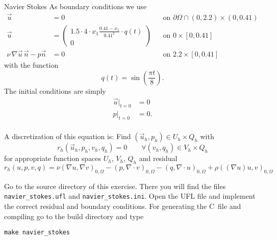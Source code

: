 \documentclass[12pt,a4paper]{article}
\def\CC{{C\nolinebreak[4]\hspace{-.05em}\raisebox{.4ex}{\tiny\bf ++}}}
\begin{document}
\begin{Exercise}{Navier Stokes}
  As boundary conditions we use
  \begin{align*}
    \vec{u} &= 0 && \text{on $\partial\Omega \cap (0,2.2)\times(0,0.41)$} \\
    \vec{u} &=
    \begin{pmatrix}
      1.5 \cdot 4 \cdot x_1 \frac{0.41-x_1}{0.41^2} \cdot q(t) \\ 0
    \end{pmatrix} && \text{on $0\times[0,0.41]$}\\
    \nu \, \nabla \vec{u} \, \vec{n} - p\vec{n} &= 0 && \text{on $2.2\times[0,0.41]$}
  \end{align*}
  with the function
  \begin{equation*}
    q(t) = \sin\left(\frac{\pi t}{8}\right).
  \end{equation*}
  The initial conditions are simply
  \begin{align*}
    \vec{u}|_{t=0} &= 0 \\
    p|_{t=0} &= 0. \\
  \end{align*}

  A discretization of this equation is: Find
  $(\vec{u}_h,p_h) \in U_h\times Q_h$ with
  \begin{equation*}
    r_h(\vec{u}_h, p_h, v_h, q_h) = 0 \qquad \forall (v_h,q_h) \in V_h\times Q_h
  \end{equation*}
  for appropriate function spaces $U_h$, $V_h$, $Q_h$ and residual
  \begin{equation}
    r_h(u,p,v,q)
    = \nu (\nabla u, \nabla v)_{0,\Omega}
    - (p, \nabla \cdot v)_{0,\Omega}
    - (q, \nabla \cdot u)_{0, \Omega}
    + \rho ((\nabla u) u, v)_{0, \Omega}
    \label{eq:ns-residual}
  \end{equation}

  Go to the source directory of this exercise. There you will find the files
  \lstinline{navier_stokes.ufl} and \lstinline{navier_stokes.ini}. Open the UFL
  file and implement the correct residual and boundary conditions. For
  generating the \CC\ file and compiling go to the build directory and type
  \begin{lstlisting}
make navier_stokes
  \end{lstlisting}


\end{Exercise}
\end{document}

